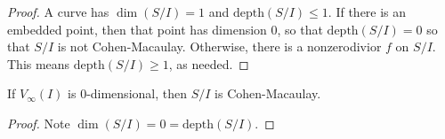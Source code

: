 \documentclass[co439]{subfiles}
\begin{document}
    \begin{proof}
        A curve has $\dim\left( S /I \right) =1$ and $\text{depth}\left( S /I \right) \leq 1$. If there is an embedded point, then that point has dimension $0$, so that $\text{depth}\left( S /I \right) = 0$ so that $S /I$ is not Cohen-Macaulay. Otherwise, there is a nonzerodivior $f$ on $S /I$. This means $\text{depth}\left( S /I \right)\geq 1$, as needed.
    \end{proof}
    
    \begin{prop}{}
        If $V_{\infty}\left( I \right)$ is $0$-dimensional, then $S /I$ is Cohen-Macaulay.
    \end{prop}

    \begin{proof}
        Note $\dim\left( S /I \right) = 0 = \text{depth}\left( S /I \right)$.
    \end{proof}
\end{document}
